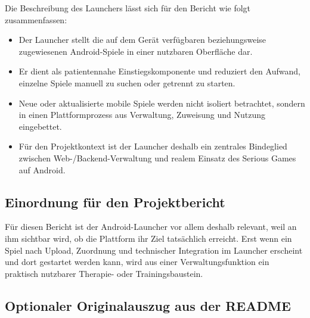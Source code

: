 \documentclass[12pt,a4paper]{article}
\begin{document}
Die Beschreibung des Launchers lässt sich für den Bericht wie folgt zusammenfassen:
\begin{itemize}[leftmargin=1.5em]
  \item Der Launcher stellt die auf dem Gerät verfügbaren beziehungsweise zugewiesenen Android-Spiele in einer nutzbaren Oberfläche dar.
  \item Er dient als patientennahe Einstiegskomponente und reduziert den Aufwand, einzelne Spiele manuell zu suchen oder getrennt zu starten.
  \item Neue oder aktualisierte mobile Spiele werden nicht isoliert betrachtet, sondern in einen Plattformprozess aus Verwaltung, Zuweisung und Nutzung eingebettet.
  \item Für den Projektkontext ist der Launcher deshalb ein zentrales Bindeglied zwischen Web-/Backend-Verwaltung und realem Einsatz des Serious Games auf Android.
\end{itemize}

\subsection*{Einordnung für den Projektbericht}
Für diesen Bericht ist der Android-Launcher vor allem deshalb relevant, weil an ihm sichtbar wird, ob die Plattform ihr Ziel tatsächlich erreicht. Erst wenn ein Spiel nach Upload, Zuordnung und technischer Integration im Launcher erscheint und dort gestartet werden kann, wird aus einer Verwaltungsfunktion ein praktisch nutzbarer Therapie- oder Trainingsbaustein.

\subsection*{Optionaler Originalauszug aus der README}
\end{document}
